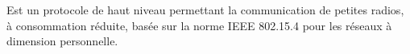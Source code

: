 \item[ZigBeePro]
 Est un protocole de haut niveau permettant la communication de petites radios, à consommation réduite, basée sur la norme IEEE 802.15.4 pour les réseaux à dimension personnelle.